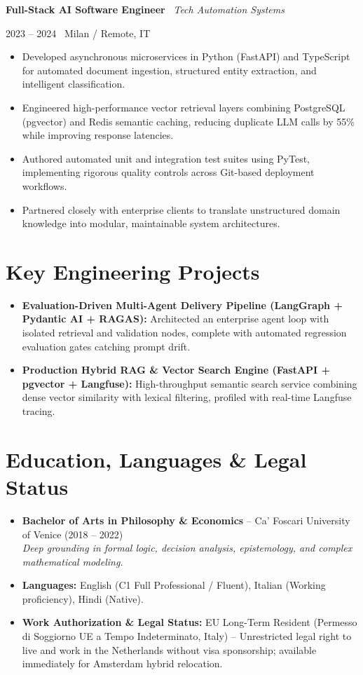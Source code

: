 \documentclass[a4paper,10pt]{article}
\newcommand{\role}[4]{%
  \vspace{2pt}\noindent
  \begin{minipage}[t]{0.70\textwidth}\raggedright\textbf{#1} \textbullet\ \textit{#3}\end{minipage}%
  \hfill
  \begin{minipage}[t]{0.28\textwidth}\raggedleft\footnotesize\color{gray}#2 \textbullet\ #4\end{minipage}%
  \vspace{1pt}%
}
\begin{document}
\vspace{3pt}
\role{Full-Stack AI Software Engineer}{2023 -- 2024}{Tech Automation Systems}{Milan / Remote, IT}
\begin{itemize}
  \item Developed asynchronous microservices in Python (FastAPI) and TypeScript for automated document ingestion, structured entity extraction, and intelligent classification.
  \item Engineered high-performance vector retrieval layers combining PostgreSQL (pgvector) and Redis semantic caching, reducing duplicate LLM calls by 55\% while improving response latencies.
  \item Authored automated unit and integration test suites using PyTest, implementing rigorous quality controls across Git-based deployment workflows.
  \item Partnered closely with enterprise clients to translate unstructured domain knowledge into modular, maintainable system architectures.
\end{itemize}

\section{Key Engineering Projects}
\begin{itemize}
  \item \textbf{Evaluation-Driven Multi-Agent Delivery Pipeline (LangGraph + Pydantic AI + RAGAS):} Architected an enterprise agent loop with isolated retrieval and validation nodes, complete with automated regression evaluation gates catching prompt drift.
  \item \textbf{Production Hybrid RAG \& Vector Search Engine (FastAPI + pgvector + Langfuse):} High-throughput semantic search service combining dense vector similarity with lexical filtering, profiled with real-time Langfuse tracing.
\end{itemize}

\section{Education, Languages \& Legal Status}
\begin{itemize}
  \item \textbf{Bachelor of Arts in Philosophy \& Economics} -- Ca' Foscari University of Venice (2018 -- 2022) \\
  \textit{Deep grounding in formal logic, decision analysis, epistemology, and complex mathematical modeling.}
  \item \textbf{Languages:} English (C1 Full Professional / Fluent), Italian (Working proficiency), Hindi (Native).
  \item \textbf{Work Authorization \& Legal Status:} EU Long-Term Resident (Permesso di Soggiorno UE a Tempo Indeterminato, Italy) -- Unrestricted legal right to live and work in the Netherlands without visa sponsorship; available immediately for Amsterdam hybrid relocation.
\end{itemize}
\end{document}
